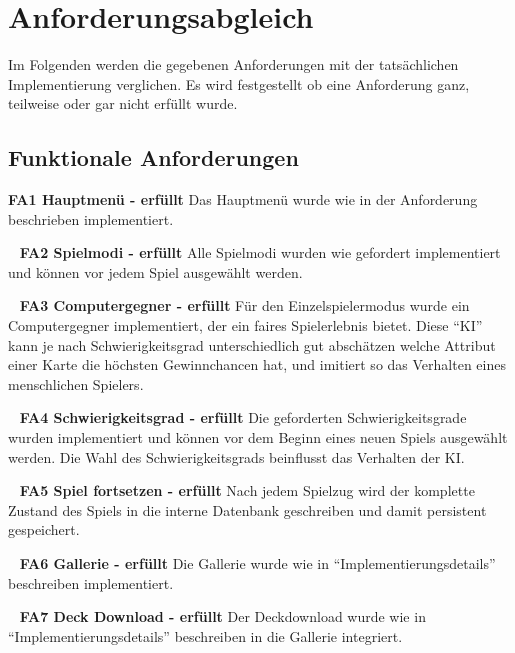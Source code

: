 \documentclass{scrartcl}
\begin{document}
\section{Anforderungsabgleich}

Im Folgenden werden die gegebenen Anforderungen mit der tatsächlichen
Implementierung verglichen. Es wird festgestellt ob eine Anforderung ganz,
teilweise oder gar nicht erfüllt wurde.

\subsection{Funktionale Anforderungen}

\textbf{FA1 Hauptmenü - erfüllt} \newline
Das Hauptmenü wurde wie in der Anforderung beschrieben implementiert.

\ \newline
\textbf{FA2 Spielmodi - erfüllt} \newline
Alle Spielmodi wurden wie gefordert implementiert und können vor jedem Spiel
ausgewählt werden.

\ \newline
\textbf{FA3 Computergegner - erfüllt} \newline
Für den Einzelspielermodus wurde ein Computergegner implementiert, der ein
faires Spielerlebnis bietet. Diese \enquote{KI} kann je nach Schwierigkeitsgrad
unterschiedlich gut abschätzen welche Attribut einer Karte die höchsten
Gewinnchancen hat, und imitiert so das Verhalten eines menschlichen Spielers.

\ \newline
\textbf{FA4 Schwierigkeitsgrad - erfüllt} \newline
Die geforderten Schwierigkeitsgrade wurden implementiert und können vor dem
Beginn eines neuen Spiels ausgewählt werden. Die Wahl des Schwierigkeitsgrads
beinflusst das Verhalten der KI.

\ \newline
\textbf{FA5 Spiel fortsetzen - erfüllt} \newline
Nach jedem Spielzug wird der komplette Zustand des Spiels in die interne
Datenbank geschreiben und damit persistent gespeichert.

\ \newline
\textbf{FA6 Gallerie - erfüllt} \newline
Die Gallerie wurde wie in \enquote{Implementierungsdetails} beschreiben
implementiert.

\ \newline
\textbf{FA7 Deck Download - erfüllt} \newline
Der Deckdownload wurde wie in \enquote{Implementierungsdetails} beschreiben in
die Gallerie integriert.
\end{document}
